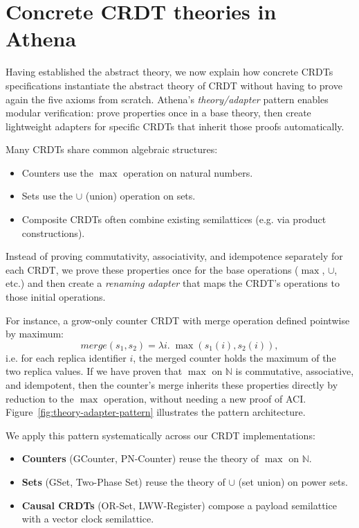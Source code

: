 \section{Concrete CRDT theories in Athena}

Having established the abstract theory, we now explain how concrete CRDTs specifications instantiate the abstract theory of CRDT without having to prove again the five axioms from scratch. Athena's \emph{theory/adapter} pattern enables modular verification: prove properties once in a base theory, then create lightweight adapters for specific CRDTs that inherit those proofs automatically.

Many CRDTs share common algebraic structures:
\begin{itemize}
  \item Counters use the $\max$ operation on natural numbers.
  \item Sets use the $\cup$ (union) operation on sets.
  \item Composite CRDTs often combine existing semilattices (e.g. via product constructions).
\end{itemize}

Instead of proving commutativity, associativity, and idempotence separately for each CRDT, we prove these properties once for the base operations ($\max$, $\cup$, etc.) and then create a \emph{renaming adapter} that maps the CRDT's operations to those initial operations. 

For instance, a grow-only counter CRDT with merge operation defined pointwise by maximum:
\[
 \mathit{merge}(s_1, s_2) = \lambda i.\; \max(s_1(i), s_2(i)),
\] 
i.e. for each replica identifier $i$, the merged counter holds the maximum of the two replica values. If we have proven that $\max$ on $\mathbb{N}$ is commutative, associative, and idempotent, then the counter's merge inherits these properties directly by reduction to the $\max$ operation, without needing a new proof of ACI. Figure~\ref{fig:theory-adapter-pattern} illustrates the pattern architecture.


We apply this pattern systematically across our CRDT implementations:
\begin{itemize}
  \item \textbf{Counters} (GCounter, PN-Counter) reuse the theory of $\max$ on $\mathbb{N}$.
  \item \textbf{Sets} (GSet, Two-Phase Set) reuse the theory of $\cup$ (set union) on power sets.
  \item \textbf{Causal CRDTs} (OR-Set, LWW-Register) compose a payload semilattice with a vector clock semilattice.
\end{itemize}

